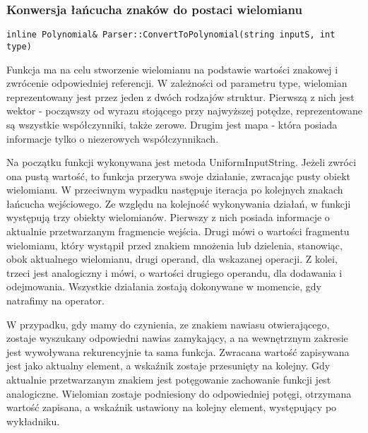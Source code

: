 \documentclass[twoside,a4paper]{book}
\begin{document}
\subsubsection{Konwersja łańcucha znaków do postaci wielomianu}
\begin{lstlisting}
inline Polynomial& Parser::ConvertToPolynomial(string inputS, int type)
\end{lstlisting}

Funkcja ma na celu stworzenie wielomianu na podstawie wartości znakowej i zwrócenie odpowiedniej referencji. W zależności od parametru type, wielomian reprezentowany jest przez jeden z dwóch rodzajów struktur. Pierwszą z nich jest wektor - począwszy od wyrazu stojącego przy najwyższej potędze, reprezentowane są wszystkie współczynniki, także zerowe. Drugim jest mapa - która posiada informacje tylko o niezerowych współczynnikach.

Na początku funkcji wykonywana jest metoda UniformInputString. Jeżeli zwróci ona pustą wartość, to funkcja przerywa swoje działanie, zwracając pusty obiekt wielomianu. W przeciwnym wypadku następuje iteracja po kolejnych znakach łańcucha wejściowego. Ze względu na kolejność wykonywania działań, w funkcji występują trzy obiekty wielomianów. Pierwszy z nich posiada informacje o aktualnie przetwarzanym fragmencie wejścia. Drugi mówi o wartości fragmentu wielomianu, który wystąpił przed znakiem mnożenia lub dzielenia, stanowiąc, obok aktualnego wielomianu, drugi operand, dla wskazanej operacji. Z kolei, trzeci jest analogiczny i mówi, o wartości drugiego operandu, dla dodawania i odejmowania. Wszystkie działania zostają dokonywane w momencie, gdy natrafimy na operator.

W przypadku, gdy mamy do czynienia, ze znakiem nawiasu otwierającego, zostaje wyszukany odpowiedni nawias zamykający, a na wewnętrznym zakresie jest wywoływana rekurencyjnie ta sama funkcja. Zwracana wartość zapisywana jest jako aktualny element, a wskaźnik zostaje przesunięty na kolejny. Gdy aktualnie przetwarzanym znakiem jest potęgowanie zachowanie funkcji jest analogiczne. Wielomian zostaje podniesiony do odpowiedniej potęgi, otrzymana wartość zapisana, a wskaźnik ustawiony na kolejny element, występujący po wykładniku.
\end{document}
